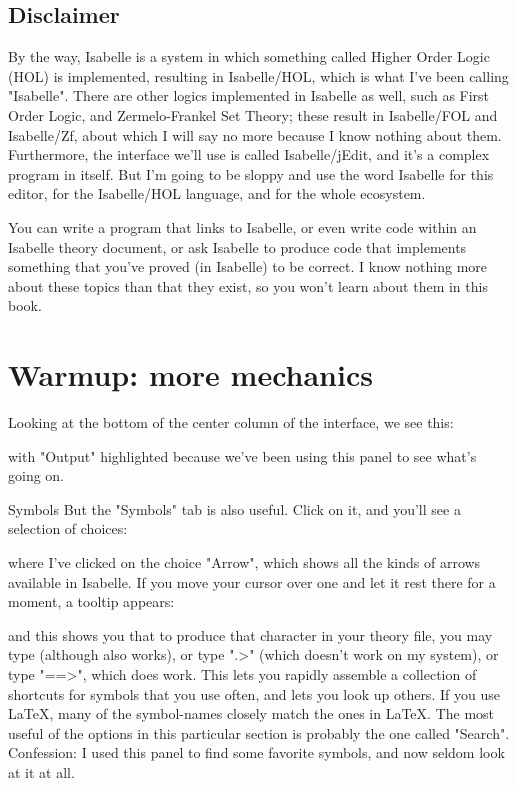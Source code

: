 \subsection*{Disclaimer}
By the way, Isabelle is a system in which something called Higher Order Logic (HOL) is implemented, resulting in Isabelle/HOL, which is what I've been calling "Isabelle". There are other logics implemented in Isabelle as well, such as First Order Logic, and Zermelo-Frankel Set Theory; these result in Isabelle/FOL and Isabelle/Zf, about which I will say no more because I know nothing about them. Furthermore, the interface we'll use is called Isabelle/jEdit, and it's a complex program in itself. But I'm going to be sloppy and use the word Isabelle for this editor, for the Isabelle/HOL language, and for the whole ecosystem. 

You can write a program that links to Isabelle, or even write code within an Isabelle theory document, or ask Isabelle to produce code that implements something that you've proved (in Isabelle) to be correct. I know nothing more about these topics than that they exist, so you won't learn about them in this book. 

\section{Warmup: more mechanics}
Looking at the bottom of the center column of the interface, we see this:



with "Output" highlighted because we've been using this panel to see what's going on. 

Symbols
But the "Symbols" tab is also useful. Click on it, and you'll see a selection of choices:

where I've clicked on the choice "Arrow", which shows all the kinds of arrows available in Isabelle. If you move your cursor over one and let it rest there for a moment, a tooltip appears:


and this shows you that to produce that character in your theory file, you may type  (although \isi{\\Longrightarrow} also works), or type ".>" (which doesn't work on my system), or type "==>", which does work. This lets you rapidly assemble a collection of shortcuts for symbols that you use often, and lets you look up others. If you use LaTeX, many of the symbol-names closely match the ones in LaTeX. The most useful of the options in this particular section is probably the one called "Search". Confession: I used this panel to find some favorite symbols, and now seldom look at it at all. 

